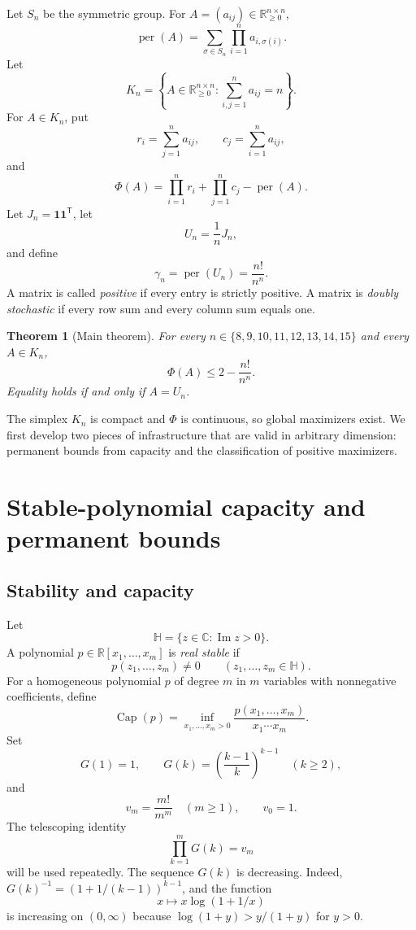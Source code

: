 \documentclass[11pt]{article}
\newtheorem{theorem}{Theorem}[section]
\theoremstyle{definition}
\newcommand{\per}{\operatorname{per}}
\newcommand{\pcap}{\operatorname{Cap}}
\newcommand{\Rge}{\mathbb{R}_{\ge 0}}
\newcommand{\1}{\mathbf{1}}
\newcommand{\cH}{\mathbb{H}}
\begin{document}
Let $S_n$ be the symmetric group.  For $A=(a_{ij})\in\Rge^{n\times n}$,
\[
 \per(A)=\sum_{\sigma\in S_n}\prod_{i=1}^n a_{i,\sigma(i)}.
\]
Let
\[
 K_n=\left\{A\in\Rge^{n\times n}:\sum_{i,j=1}^n a_{ij}=n\right\}.
\]
For $A\in K_n$, put
\[
 r_i=\sum_{j=1}^n a_{ij},\qquad c_j=\sum_{i=1}^n a_{ij},
\]
and
\[
 \Phi(A)=\prod_{i=1}^n r_i+\prod_{j=1}^n c_j-\per(A).
\]
Let $J_n=\1\1^{\mathsf T}$, let
\[
 U_n=\frac1nJ_n,
\]
and define
\[
 \gamma_n=\per(U_n)=\frac{n!}{n^n}.
\]
A matrix is called \emph{positive} if every entry is strictly positive.  A matrix is \emph{doubly stochastic} if every row sum and every column sum equals one.

\begin{theorem}[Main theorem]\label{thm:main}
For every $n\in\{8,9,10,11,12,13,14,15\}$ and every $A\in K_n$,
\[
 \Phi(A)\le 2-\frac{n!}{n^n}.
\]
Equality holds if and only if $A=U_n$.
\end{theorem}

The simplex $K_n$ is compact and $\Phi$ is continuous, so global maximizers exist.  We first develop two pieces of infrastructure that are valid in arbitrary dimension: permanent bounds from capacity and the classification of positive maximizers.

\section{Stable-polynomial capacity and permanent bounds}\label{sec:capacity}

\subsection{Stability and capacity}

Let
\[
 \cH=\{z\in\mathbb C:\operatorname{Im}z>0\}.
\]
A polynomial $p\in\mathbb R[x_1,\dots,x_m]$ is \emph{real stable} if
\[
 p(z_1,\dots,z_m)\ne0
 \qquad(z_1,\dots,z_m\in\cH).
\]
For a homogeneous polynomial $p$ of degree $m$ in $m$ variables with nonnegative coefficients, define
\[
 \pcap(p)=\inf_{x_1,\dots,x_m>0}
 \frac{p(x_1,\dots,x_m)}{x_1\cdots x_m}.
\]
Set
\[
 G(1)=1,
 \qquad
 G(k)=\left(\frac{k-1}{k}\right)^{k-1}\quad(k\ge2),
\]
and
\[
 v_m=\frac{m!}{m^m}\quad(m\ge1),
 \qquad v_0=1.
\]
The telescoping identity
\[
 \prod_{k=1}^mG(k)=v_m
 \tag{3.1}\label{eq:telescoping}
\]
will be used repeatedly.  The sequence $G(k)$ is decreasing.  Indeed,
$G(k)^{-1}=(1+1/(k-1))^{k-1}$, and the function
\[
 x\longmapsto x\log(1+1/x)
\]
is increasing on $(0,\infty)$ because
$\log(1+y)>y/(1+y)$ for $y>0$.
\end{document}
